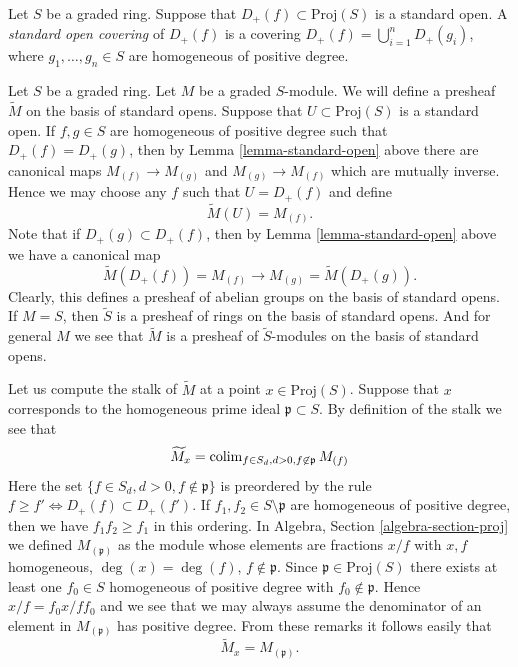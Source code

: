 \begin{definition}
\label{definition-standard-covering}
Let $S$ be a graded ring.
Suppose that $D_{+}(f) \subset \text{Proj}(S)$ is a standard
open. A {\it standard open covering} of $D_{+}(f)$
is a covering $D_{+}(f) = \bigcup_{i = 1}^n D_{+}(g_i)$,
where $g_1, \ldots, g_n \in S$ are homogeneous of positive degree.
\end{definition}

\noindent
Let $S$ be a graded ring. Let $M$ be a graded $S$-module. We will define
a presheaf $\widetilde M$ on the basis of standard opens.
Suppose that $U \subset \text{Proj}(S)$ is a standard open.
If $f, g \in S$ are homogeneous of positive degree
such that $D_{+}(f) = D_{+}(g)$, then
by Lemma \ref{lemma-standard-open} above there are canonical
maps $M_{(f)} \to M_{(g)}$ and $M_{(g)} \to M_{(f)}$ which are
mutually inverse. Hence we may choose any $f$ such that $U = D_{+}(f)$
and define
$$
\widetilde M(U) = M_{(f)}.
$$
Note that if $D_{+}(g) \subset D_{+}(f)$, then by
Lemma \ref{lemma-standard-open} above we have
a canonical map
$$
\widetilde M(D_{+}(f)) = M_{(f)} \longrightarrow
M_{(g)} = \widetilde M(D_{+}(g)).
$$
Clearly, this defines a presheaf of abelian groups on the basis
of standard opens. If $M = S$, then $\widetilde S$ is a presheaf
of rings on the basis of standard opens. And for general $M$ we
see that $\widetilde M$ is a presheaf of $\widetilde S$-modules
on the basis of standard opens.

\medskip\noindent
Let us compute the stalk of $\widetilde M$ at a point
$x \in \text{Proj}(S)$.
Suppose that $x$ corresponds to the homogeneous prime
ideal $\mathfrak p \subset S$.
By definition of the stalk we see that
$$
\widetilde M_x
=
\mathop{\mathrm{colim}}\nolimits_{f\in S_d, d > 0, f\not\in \mathfrak p} M_{(f)}
$$
Here the set $\{f \in S_d, d > 0, f \not \in \mathfrak p\}$ is preordered by
the rule $f \geq f' \Leftrightarrow D_{+}(f) \subset D_{+}(f')$.
If $f_1, f_2 \in S \setminus \mathfrak p$ are homogeneous of positive
degree, then we have
$f_1f_2 \geq f_1$ in this ordering. In
Algebra, Section \ref{algebra-section-proj}
we defined $M_{(\mathfrak p)}$ as the module whose elements are fractions
$x/f$ with $x, f$ homogeneous, $\deg(x) = \deg(f)$, $f \not \in \mathfrak p$.
Since $\mathfrak p \in \text{Proj}(S)$ there exists at least
one $f_0 \in S$ homogeneous of positive degree with $f_0 \not\in \mathfrak p$.
Hence $x/f = f_0x/ff_0$ and we see that we may always assume
the denominator of an element in $M_{(\mathfrak p)}$ has positive degree.
From these remarks it follows easily that
$$
\widetilde M_x = M_{(\mathfrak p)}.
$$

